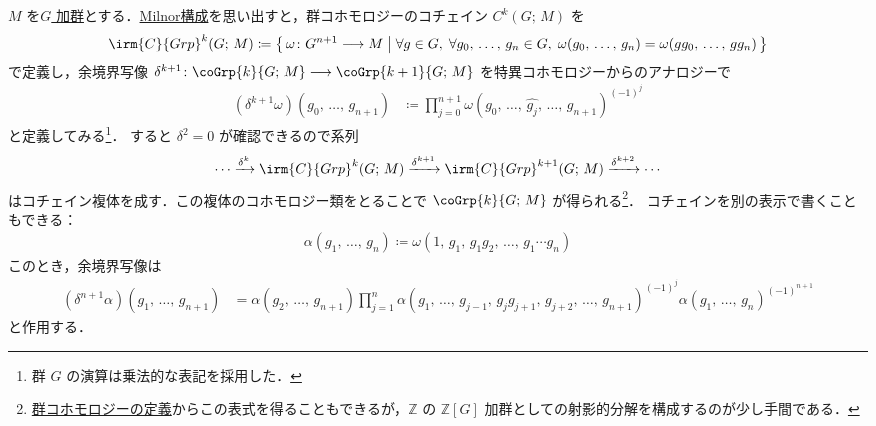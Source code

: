 \documentclass[TQFT_main]{subfiles}
\begin{document}
$M$ を\hyperref[ax:G-mod]{$G$ 加群}とする．\hyperref[]{Milnor構成}を思い出すと，群コホモロジーのコチェイン $C^k (G;\, M)$ を
\begin{align}
    \irm{C}{Grp}^k (G;\, M) \coloneqq \bigl\{\, \omega \colon G^{n+1} \lto M\bigm| \forall g \in G,\; \forall g_0,\, \dots,\, g_n \in G,\; \omega(g_0,\, \dots,\, g_n) = \omega(gg_0,\, \dots,\, gg_n) \,\bigr\} 
\end{align}
で定義し，余境界写像 $\delta^{k+1} \colon \coGrp{k}{G;\, M} \lto \coGrp{k+1}{G;\, M}$ を特異コホモロジーからのアナロジーで
\begin{align}
    (\delta^{k+1} \omega)(g_0,\, \dots,\, g_{n+1})
    &\coloneqq \prod_{j=0}^{n+1} \omega(g_0,\, \dots,\, \widehat{g_j},\, \dots ,\, g_{n+1})^{(-1)^j}
\end{align}
と定義してみる\footnote{群 $G$ の演算は乗法的な表記を採用した．}．
すると $\delta^2 = 0$ が確認できるので系列
\begin{align}
    \cdots \xrightarrow{\delta^k} \irm{C}{Grp}^k (G;\, M) \xrightarrow{\delta^{k+1}} \irm{C}{Grp}^{k+1} (G;\, M) \xrightarrow{\delta^{k+2}} \cdots
\end{align}
はコチェイン複体を成す．この複体のコホモロジー類をとることで $\coGrp{k}{G;\, M}$ が得られる\footnote{\hyperref[def:group-cohomology]{群コホモロジーの定義}からこの表式を得ることもできるが，$\mathbb{Z}$ の $\mathbb{Z}[G]$ 加群としての射影的分解を構成するのが少し手間である．}．
コチェインを別の表示で書くこともできる：
\begin{align}
    \alpha(g_1,\, \dots,\, g_n) \coloneqq \omega(1,\, g_1,\, g_1g_2,\, \dots,\, g_1 \cdots g_n)
\end{align}
このとき，余境界写像は
\begin{align}
    (\delta^{n+1} \alpha)(g_1,\, \dots,\, g_{n+1})
    &= \alpha(g_2,\, \dots,\, g_{n+1}) \prod_{j=1}^n \alpha(g_1,\, \dots,\, g_{j-1},\, g_j g_{j+1},\, g_{j+2},\, \dots,\, g_{n+1})^{(-1)^j} \alpha(g_1,\, \dots,\, g_n)^{(-1)^{n+1}}
\end{align}
と作用する．
\end{document}
